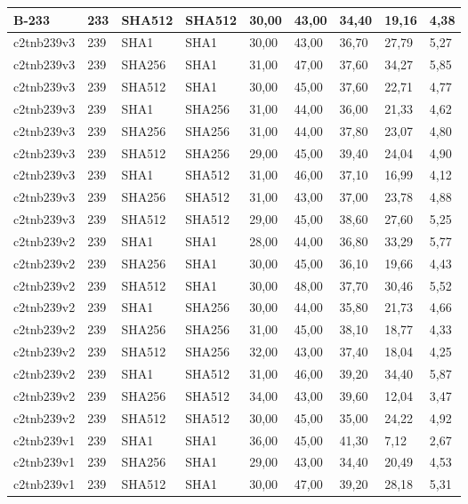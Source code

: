 \begin{longtable}{| l | l | l | l | l |l |l |l |l |}
B-233 & 233 & SHA512 & SHA512 & 30,00 & 43,00 & 34,40 & 19,16 & 4,38 \\ \hline 
c2tnb239v3 & 239 & SHA1 & SHA1 & 30,00 & 43,00 & 36,70 & 27,79 & 5,27 \\ \hline 
c2tnb239v3 & 239 & SHA256 & SHA1 & 31,00 & 47,00 & 37,60 & 34,27 & 5,85 \\ \hline 
c2tnb239v3 & 239 & SHA512 & SHA1 & 30,00 & 45,00 & 37,60 & 22,71 & 4,77 \\ \hline 
c2tnb239v3 & 239 & SHA1 & SHA256 & 31,00 & 44,00 & 36,00 & 21,33 & 4,62 \\ \hline 
c2tnb239v3 & 239 & SHA256 & SHA256 & 31,00 & 44,00 & 37,80 & 23,07 & 4,80 \\ \hline 
c2tnb239v3 & 239 & SHA512 & SHA256 & 29,00 & 45,00 & 39,40 & 24,04 & 4,90 \\ \hline 
c2tnb239v3 & 239 & SHA1 & SHA512 & 31,00 & 46,00 & 37,10 & 16,99 & 4,12 \\ \hline 
c2tnb239v3 & 239 & SHA256 & SHA512 & 31,00 & 43,00 & 37,00 & 23,78 & 4,88 \\ \hline 
c2tnb239v3 & 239 & SHA512 & SHA512 & 29,00 & 45,00 & 38,60 & 27,60 & 5,25 \\ \hline 
c2tnb239v2 & 239 & SHA1 & SHA1 & 28,00 & 44,00 & 36,80 & 33,29 & 5,77 \\ \hline 
c2tnb239v2 & 239 & SHA256 & SHA1 & 30,00 & 45,00 & 36,10 & 19,66 & 4,43 \\ \hline 
c2tnb239v2 & 239 & SHA512 & SHA1 & 30,00 & 48,00 & 37,70 & 30,46 & 5,52 \\ \hline 
c2tnb239v2 & 239 & SHA1 & SHA256 & 30,00 & 44,00 & 35,80 & 21,73 & 4,66 \\ \hline 
c2tnb239v2 & 239 & SHA256 & SHA256 & 31,00 & 45,00 & 38,10 & 18,77 & 4,33 \\ \hline 
c2tnb239v2 & 239 & SHA512 & SHA256 & 32,00 & 43,00 & 37,40 & 18,04 & 4,25 \\ \hline 
c2tnb239v2 & 239 & SHA1 & SHA512 & 31,00 & 46,00 & 39,20 & 34,40 & 5,87 \\ \hline 
c2tnb239v2 & 239 & SHA256 & SHA512 & 34,00 & 43,00 & 39,60 & 12,04 & 3,47 \\ \hline 
c2tnb239v2 & 239 & SHA512 & SHA512 & 30,00 & 45,00 & 35,00 & 24,22 & 4,92 \\ \hline 
c2tnb239v1 & 239 & SHA1 & SHA1 & 36,00 & 45,00 & 41,30 & 7,12 & 2,67 \\ \hline 
c2tnb239v1 & 239 & SHA256 & SHA1 & 29,00 & 43,00 & 34,40 & 20,49 & 4,53 \\ \hline 
c2tnb239v1 & 239 & SHA512 & SHA1 & 30,00 & 47,00 & 39,20 & 28,18 & 5,31 \\ \hline 

\end{longtable}

